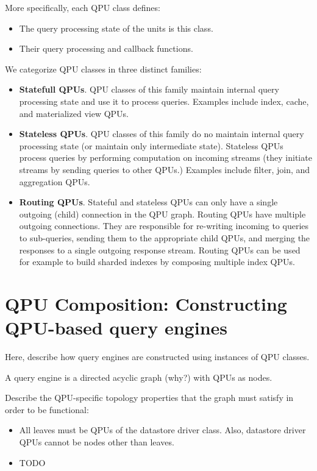 More specifically, each QPU class defines:
\begin{itemize}
  \item The query processing state of the units is this class.
  \item Their query processing and callback functions.
\end{itemize}

We categorize QPU classes in three distinct families:
\begin{itemize}
  \item \textbf{Statefull QPUs}. QPU classes of this family maintain internal
  query processing state and use it to process queries.
  Examples include index, cache, and materialized view QPUs.
  \item \textbf{Stateless QPUs}. QPU classes of this family do no maintain
  internal query processing state (or maintain only intermediate state).
  Stateless QPUs process queries by performing computation on incoming streams
  (they initiate streams by sending queries to other QPUs.)
  Examples include filter, join, and aggregation QPUs.
  \item \textbf{Routing QPUs}. Stateful and stateless QPUs can only have a
  single outgoing (child) connection in the QPU graph.
  Routing QPUs have multiple outgoing connections.
  They are responsible for re-writing incoming to queries to sub-queries,
  sending them to the appropriate child QPUs, and merging the responses to a
  single outgoing response stream.
  Routing QPUs can be used for example to build sharded indexes by composing
  multiple index QPUs.
\end{itemize}

\section{QPU Composition: Constructing QPU-based query engines}
Here, describe how query engines are constructed using instances of QPU classes.

A query engine is a directed acyclic graph (why?) with QPUs as nodes.

Describe the QPU-specific topology properties that the graph must satisfy in
order to be functional:
\begin{itemize}
  \item All leaves must be QPUs of the datastore driver class.
  Also, datastore driver QPUs cannot be nodes other than leaves.
  \item TODO
\end{itemize}

